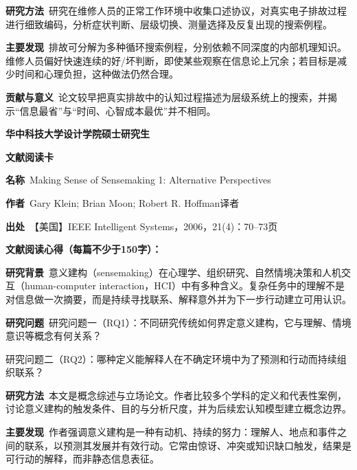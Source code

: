 \noindent\textbf{研究方法}\ 研究在维修人员的正常工作环境中收集口述协议，对真实电子排故过程进行细致编码，分析症状判断、层级切换、测量选择及反复出现的搜索例程。\par
\noindent\textbf{主要发现}\ 排故可分解为多种循环搜索例程，分别依赖不同深度的内部机理知识。维修人员偏好快速连续的好/坏判断，即使某些观察在信息论上冗余；若目标是减少时间和心理负担，这种做法仍然合理。\par
\noindent\textbf{贡献与意义}\ 论文较早把真实排故中的认知过程描述为层级系统上的搜索，并揭示“信息最省”与“时间、心智成本最优”并不相同。\par
\clearpage
\begin{center}
{\songti\bfseries\fontsize{18.5pt}{27.75pt}\selectfont 华中科技大学设计学院硕士研究生\par}
{\songti\bfseries\fontsize{18.5pt}{27.75pt}\selectfont 文献阅读卡\par}
\end{center}
\vspace{0.25em}
\noindent\underline{}\par
\vspace{0.35em}
\noindent\textbf{名称}\ Making Sense of Sensemaking 1: Alternative Perspectives\par
\noindent\textbf{作者}\ Gary Klein; Brian Moon; Robert R. Hoffman\quad 译者\par
\noindent\textbf{出处}\ 【美国】IEEE Intelligent Systems，2006，21(4)：70–73\quad 页\par
\vspace{0.35em}
\noindent\textbf{文献阅读心得（每篇不少于150字）：}\par
\noindent\textbf{研究背景}\ 意义建构（sensemaking）在心理学、组织研究、自然情境决策和人机交互（human-computer interaction，HCI）中有多种含义。复杂任务中的理解不是对信息做一次摘要，而是持续寻找联系、解释意外并为下一步行动建立可用认识。\par
\noindent\textbf{研究问题}\ 研究问题一（RQ1）：不同研究传统如何界定意义建构，它与理解、情境意识等概念有何关系？\par
研究问题二（RQ2）：哪种定义能解释人在不确定环境中为了预测和行动而持续组织联系？\par
\noindent\textbf{研究方法}\ 本文是概念综述与立场论文。作者比较多个学科的定义和代表性案例，讨论意义建构的触发条件、目的与分析尺度，并为后续宏认知模型建立概念边界。\par
\noindent\textbf{主要发现}\ 作者强调意义建构是一种有动机、持续的努力：理解人、地点和事件之间的联系，以预测其发展并有效行动。它常由惊讶、冲突或知识缺口触发，结果是可行动的解释，而非静态信息表征。\par
